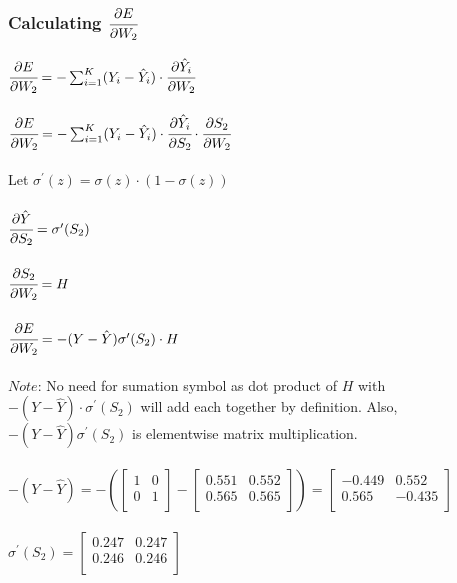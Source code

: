 \documentclass{article}
\begin{document}
\subsubsection{Calculating $\cfrac{\partial E}{\partial W_2}$}
$\cfrac{\partial E}{\partial W_2} = -\sum_{i=1}^{K} (Y_i - \hat{Y}_i) \cdot
\cfrac{\partial\hat{Y}_i}{\partial W_2}$\\
\\$\cfrac{\partial E}{\partial W_2} = -\sum_{i=1}^{K} (Y_i - \hat{Y}_i) \cdot
\cfrac{\partial\hat{Y}_i}{\partial S_2}\cdot\cfrac{\partial S_2}{\partial W_2}$\\
\\Let $\sigma^\prime(z) = \sigma(z)\cdot(1 - \sigma(z))$\\
\\$\cfrac{\partial\hat{Y}}{\partial S_2} = \sigma^\prime(S_2)$\\
\\$\cfrac{\partial S_2}{\partial W_2} = H$\\
\\$\cfrac{\partial E}{\partial W_2} = -(Y - \hat{Y})
\sigma^\prime(S_2)\cdot H$\\
\\$Note$: No need for sumation symbol as dot product of $H$ with $-(Y - \hat{Y})\cdot
\sigma^\prime(S_2)$ will add each together by definition. Also, $-(Y - \hat{Y})
\sigma^\prime(S_2)$ is elementwise matrix multiplication. \\
\\$-(Y - \hat{Y}) = - (
\begin{bmatrix}
1 & 0 \\
0 & 1 \\
\end{bmatrix} -
\begin{bmatrix}
0.551 & 0.552 \\
0.565 & 0.565 \\
\end{bmatrix}
) =
\begin{bmatrix}
-0.449 & 0.552 \\
0.565 & -0.435 \\
\end{bmatrix}
$\\
\\ $\sigma^\prime(S_2) =
\begin{bmatrix}
0.247 & 0.247 \\
0.246 & 0.246 \\
\end{bmatrix}$\\
\end{document}
